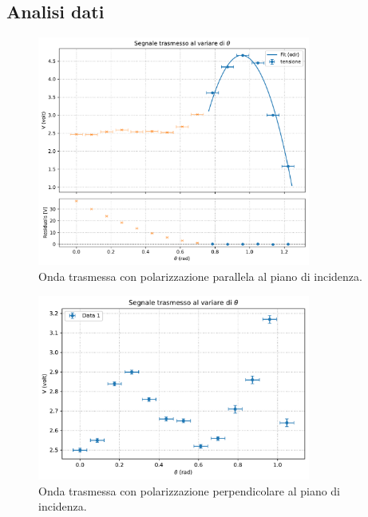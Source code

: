 \documentclass[a4paper]{article}
\begin{document}
\subsection{Analisi dati}
\begin{figure}[htbp]
	\centering
	\includegraphics[width=0.8\textwidth]{grafici/brewster.pdf}
	\caption{Onda trasmessa con polarizzazione parallela al piano di incidenza.}
	\label{fig:brewster_par_grafico}
\end{figure}
\begin{figure}[htbp]
	\centering
	\includegraphics[width=0.8\textwidth]{grafici/brewster1.pdf}
	\caption{Onda trasmessa con polarizzazione perpendicolare al piano di incidenza.}
	\label{fig:brewster_perp_grafico}
\end{figure}
\end{document}
